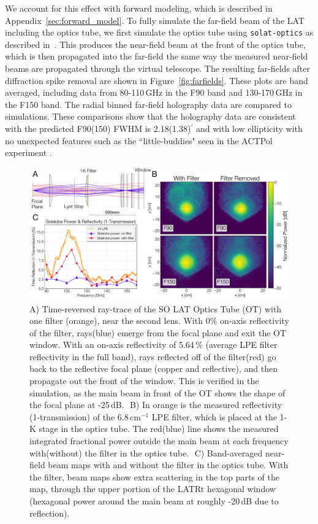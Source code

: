 We account for this effect with forward modeling, which is described in Appendix~\ref{sec:forward_model}.  To fully simulate the far-field beam of the LAT including the optics tube, we first simulate the optics tube using \verb|solat-optics| as described in~\cite{holog_sim_model}.  This produces the near-field beam at the front of the optics tube, which is then propagated into the far-field the same way the measured near-field beams are propagated through the virtual telescope.  The resulting far-fields after diffraction spike removal are shown in Figure~\ref{fig:farfields}.  These plots are band averaged, including data from 80-110\,GHz in the F90 band and 130-170\,GHz in the F150 band.  The radial binned far-field holography data are compared to simulations.  These comparisons show that the holography data are consistent with the predicted F90(150) FWHM is 2.18(1.38)$^{\prime}$ and with low ellipticity with no unexpected features such as the ``little-buddies" seen in the ACTPol experiment \cite{2021arXiv211212226L,Gudmundsson:21}.

\begin{figure}[t]
    \centering
    \includegraphics[width = \textwidth]{Figures/filter_fig.pdf}
    \caption{A) Time-reversed ray-trace of the SO LAT Optics Tube (OT) with one filter (orange), near the second lens.  With 0\% on-axis reflectivity of the filter, rays(blue) emerge from the focal plane and exit the OT window.  With an on-axis reflectivity of 5.64\,\% (average LPE filter reflectivity in the full band), rays reflected off of the filter(red) go back to the reflective focal plane (copper and reflective), and then propagate out the front of the window.  This is verified in the simulation, as the main beam in front of the OT shows the shape of the focal plane at -25\,dB.  \,\,B) In orange is the measured reflectivity (1-transmission) of the 6.8\,cm$^{-1}$ LPE filter, which is placed at the 1-K stage in the optics tube.  The red(blue) line shows the measured integrated fractional power outside the main beam at each frequency with(without) the filter in the optics tube.  \,\,C) Band-averaged near-field beam maps with and without the filter in the optics tube.  With the filter, beam maps show extra scattering in the top parts of the map, through the upper portion of the LATRt hexagonal window (hexagonal power around the main beam at roughly -20\,dB due to reflection).}
    \label{fig:filter_info}
\end{figure}
